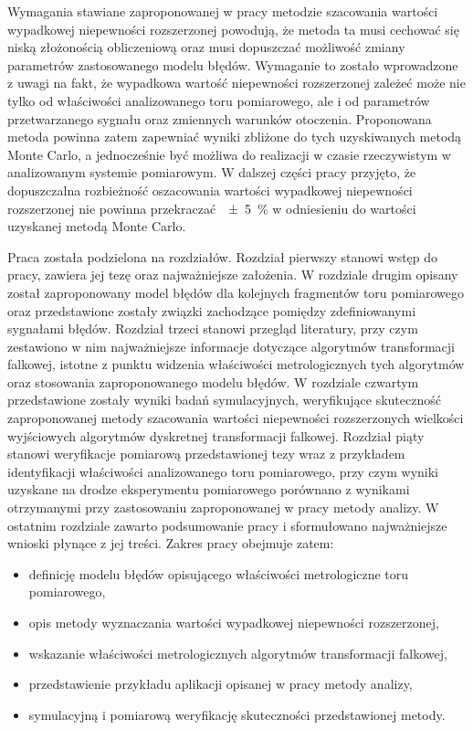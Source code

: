 Wymagania stawiane zaproponowanej w pracy metodzie szacowania wartości wypadkowej niepewności rozszerzonej powodują, że metoda ta musi cechować się niską złożonością obliczeniową oraz musi dopuszczać możliwość zmiany parametrów zastosowanego modelu błędów. Wymaganie to zostało wprowadzone z uwagi na fakt, że wypadkowa wartość niepewności rozszerzonej zależeć może nie tylko od właściwości analizowanego toru pomiarowego, ale i od parametrów przetwarzanego sygnału oraz zmiennych warunków otoczenia. Proponowana metoda powinna zatem zapewniać wyniki zbliżone do tych uzyskiwanych metodą Monte Carlo, a jednocześnie być możliwa do realizacji w czasie rzeczywistym w analizowanym systemie pomiarowym. W dalszej części pracy przyjęto, że dopuszczalna rozbieżność oszacowania wartości wypadkowej niepewności rozszerzonej nie powinna przekraczać~\qty{\pm 5}{\percent} w odniesieniu do wartości uzyskanej metodą Monte Carlo.

Praca została podzielona na  rozdziałów. Rozdział pierwszy stanowi wstęp do pracy, zawiera jej tezę oraz najważniejsze założenia. W rozdziale drugim opisany został zaproponowany model błędów dla kolejnych fragmentów toru pomiarowego oraz przedstawione zostały związki zachodzące pomiędzy zdefiniowanymi sygnałami błędów. Rozdział trzeci stanowi przegląd literatury, przy czym zestawiono w nim najważniejsze informacje dotyczące algorytmów transformacji falkowej, istotne z punktu widzenia właściwości metrologicznych tych algorytmów oraz stosowania zaproponowanego modelu błędów. W rozdziale czwartym przedstawione zostały wyniki badań symulacyjnych, weryfikujące skuteczność zaproponowanej metody szacowania wartości niepewności rozszerzonych wielkości wyjściowych algorytmów dyskretnej transformacji falkowej. Rozdział piąty stanowi weryfikacje pomiarową przedstawionej tezy wraz z przykładem identyfikacji właściwości analizowanego toru pomiarowego, przy czym wyniki uzyskane na drodze eksperymentu pomiarowego porównano z wynikami otrzymanymi przy zastosowaniu zaproponowanej w pracy metody analizy. W ostatnim rozdziale zawarto podsumowanie pracy i sformułowano najważniejsze wnioski płynące z jej treści. Zakres pracy obejmuje zatem:
\begin{itemize}
\item definicję modelu błędów opisującego właściwości metrologiczne toru pomiarowego,
\item opis metody wyznaczania wartości wypadkowej niepewności rozszerzonej,
\item wskazanie właściwości metrologicznych algorytmów transformacji falkowej,
\item przedstawienie przykładu aplikacji opisanej w pracy metody analizy,
\item symulacyjną i pomiarową weryfikację skuteczności przedstawionej metody.
\end{itemize}

